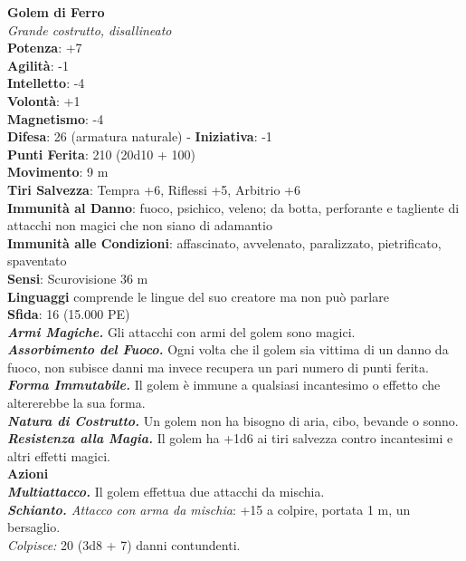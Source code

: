 \begin{multicols}{2}
\medskip\textbf{Golem di Ferro}\\
\emph{Grande costrutto, disallineato}\\
\textbf{Potenza}: +7\\
\textbf{Agilità}: -1\\
\textbf{Intelletto}: -4\\
\textbf{Volontà}: +1\\
\textbf{Magnetismo}: -4\\
\textbf{Difesa}: 26 (armatura naturale) - \textbf{Iniziativa}: -1\\
\textbf{Punti Ferita}: 210 (20d10 + 100)\\
\textbf{Movimento}: 9 m\\
\textbf{Tiri Salvezza}: Tempra +6, Riflessi +5, Arbitrio +6\\
\textbf{Immunità al Danno}: fuoco, psichico, veleno; da botta, perforante e tagliente di attacchi non magici che non siano di adamantio\\
\textbf{Immunità alle Condizioni}: affascinato, avvelenato, paralizzato, pietrificato, spaventato\\
\textbf{Sensi}: Scurovisione 36 m\\
\textbf{Linguaggi} comprende le lingue del suo creatore ma non può parlare\\
\textbf{Sfida}: 16 (15.000 PE)\smallskip\\
\emph{\textbf{Armi Magiche.}} Gli attacchi con armi del golem sono magici.\\
\emph{\textbf{Assorbimento del Fuoco.}} Ogni volta che il golem sia vittima di un danno da fuoco, non subisce danni ma invece recupera un pari numero di punti ferita.\\
\emph{\textbf{Forma Immutabile.}} Il golem è immune a qualsiasi incantesimo o effetto che altererebbe la sua forma.\\
\emph{\textbf{Natura di Costrutto.}} Un golem non ha bisogno di aria, cibo, bevande o sonno.\\
\emph{\textbf{Resistenza alla Magia.}} Il golem ha +1d6 ai tiri salvezza contro incantesimi e altri effetti magici.\\
\smallskip\textbf{Azioni}\\
\emph{\textbf{Multiattacco.}} Il golem effettua due attacchi da mischia. \\
\emph{\textbf{Schianto.} Attacco con arma da mischia}: +15 a colpire, portata 1 m, un bersaglio.\\
\emph{Colpisce:} 20 (3d8 + 7) danni contundenti.\\

\end{multicols}
